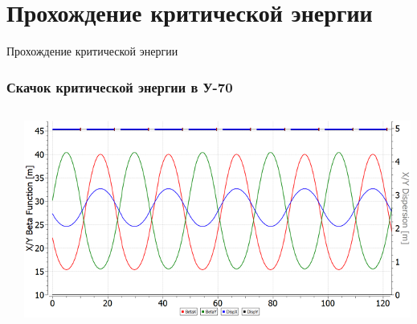 \section{Прохождение критической энергии}
\begin{frame}
	\centering \Large{Прохождение критической энергии}
\end{frame}
\begin{frame}
	\frametitle{Скачок критической энергии в У-70}
	
	\begin{columns}
		\begin{column}{0.4\textwidth}
			\raggedright
		\end{column}
		\begin{column}{0.4\textwidth}
			\begin{minipage}{\linewidth}
				\centering
				\includegraphics[width=1\columnwidth]{images/3_twiss_U70_regular.png}

\end{minipage}
\end{column}
\end{columns}
\end{frame}
